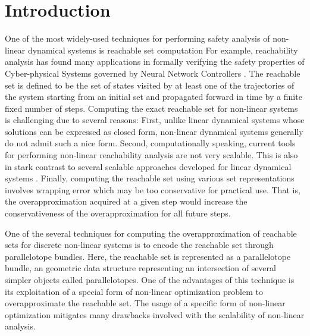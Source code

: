 \chapter{Introduction}




One of the most widely-used techniques for performing safety analysis of non-linear dynamical systems is reachable set computation
%
For example, reachability analysis has found many applications in formally verifying the safety properties of Cyber-physical Systems governed by Neural Network Controllers \cite{tran2019star, fan2020reachnn, bak2021nnenum}.
%
The reachable set is defined to be the set of states visited by at least one of the trajectories of the system starting from an initial set and propagated forward in time by a finite fixed number of steps.
%
Computing the exact reachable set for non-linear systems is challenging due to several reasons:
%
First, unlike linear dynamical systems whose solutions can be expressed as closed form, non-linear dynamical systems generally do not admit such a nice form.
%
Second, computationally speaking, current tools for performing non-linear reachability analysis are not very scalable. This is also in stark contrast to several scalable approaches developed for linear dynamical systems \cite{duggirala2016parsimonious, bak2017simulation}.
%
Finally, computing the reachable set using various set representations involves wrapping error which may be too conservative for practical use.
%
That is, the overapproximation acquired at a given step would increase the conservativeness of the overapproximation for all future steps.

One of the several techniques for computing the overapproximation of reachable sets for discrete non-linear systems is to encode the reachable set through parallelotope bundles.
%
Here, the reachable set is represented as a parallelotope bundle, an geometric data structure representing an intersection of several simpler objects called parallelotopes.
%
One of the advantages of this technique is its exploitation of a special form of non-linear optimization problem to overapproximate the reachable set.
%
The usage of a specific form of non-linear optimization mitigates many drawbacks involved with the scalability of non-linear analysis.

